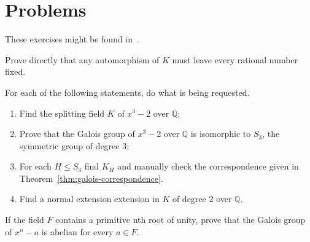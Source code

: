 \section{Problems}\label{sec:problems}

These exercises might be found in~\cite{herstein1975}.

\begin{problem}\label{problem:6}
Prove directly that any automorphism of $K$ must leave every rational number fixed.
\end{problem}

\begin{problem}\label{problem:17}
For each of the following statements, do what is being requested.
\begin{enumerate}
	\item Find the splitting field $K$ of $x^{3}-2$ over $\mathbb{Q}$;
	\item Prove that the Galois group of $x^{3}-2$ over $\mathbb{Q}$ is isomorphic to $S_{3}$, the symmetric group of degree $3$;
	\item For each ${H}\leqslant{S_{3}}$ find $K_{H}$ and manually check the correspondence given in Theorem~\ref{thm:galois-correspondence}.
	\item Find a normal extension extension in $K$ of degree $2$ over $\mathbb{Q}$.
\end{enumerate}
\end{problem}

\begin{problem}\label{problem:18}
If the field $F$ contains a primitive nth root of unity, prove that the Galois group of $x^{n}-a$ is abelian for every ${a}\in{F}$.
\end{problem}


